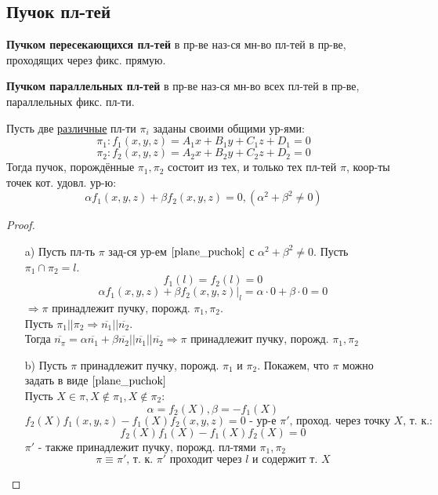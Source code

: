 \subsection{Пучок пл-тей}
\begin{definition}
\textbf{Пучком пересекающихся пл-тей} в пр-ве наз-ся мн-во пл-тей в пр-ве, проходящих через фикс. прямую.
\end{definition}
\begin{definition}
  \textbf{Пучком параллельных пл-тей} в пр-ве наз-ся мн-во всех пл-тей в пр-ве, параллельных фикс. пл-ти.
\end{definition}
\begin{theorem}
  Пусть две \underline{различные} пл-ти $\pi_i$ заданы своими общими ур-ями:
  \[
  \pi_1 \colon f_1(x, y, z) = A_1x +B_1y + C_1z + D_1 = 0
  \]
  \[
  \pi_2 \colon f_2(x, y, z) = A_2x + B_2y + C_2 z + D_2 = 0
  \]
  Тогда пучок, порождённые $\pi_1, \pi_2$ состоит из тех, и только тех пл-тей $\pi$, коор-ты точек кот. удовл. ур-ю:
  \begin{equation}
  \alpha f_1(x, y, z) + \beta f_2(x, y, z) = 0, (\alpha^{2} + \beta^{2} \not= 0)
  \label{plane_puchok}
  \end{equation}
\end{theorem}
\begin{proof}
\begin{itemize}
  \item [a) ]  Пусть пл-ть $\pi$ зад-ся ур-ем $\ref{plane_puchok}$ с $\alpha^{2} + \beta^{2} \neq 0$. Пусть $\pi_1 \cap \pi_2 = l$.
    \[
    f_1(l) = f_2(l) = 0
    \]
    \[
    \alpha f_1(x, y, z) + \beta f_2(x, y, z) |_l = \alpha \cdot 0 + \beta \cdot 0 = 0
    \]
    $\Rightarrow \pi$ принадлежит пучку, порожд. $\pi_1, \pi_2$. \\
    Пусть $\pi_1 || \pi_2 \Rightarrow \overline{n_1} || \overline{n_2}$. \\ 

    Тогда $\overline{n_\pi} = \alpha\overline{n_1} + \beta\overline{n_2} || \overline{n_1} || \overline{n_2} \Rightarrow \pi$ принадлежит пучку, порожд. $\pi_1, \pi_2$
  \item [b) ] Пусть $\pi$ принадлежит пучку, порожд. $\pi_1$ и $\pi_2$. Покажем, что $\pi$ можно задать в виде $\ref{plane_puchok}$ \\

    Пусть $X \in \pi, X \not\in \pi_1, X \not\in \pi_2$:
    \[
    \alpha = f_2(X), \beta = -f_1(X)
    \]
    \[
    f_2(X)f_1(x, y, z) - f_1(X)f_2(x, y, z) = 0 \text{ - ур-е $\pi'$, проход. через точку $X$, т. к.:}
    \]
    \[
    f_2(X)f_1(X) - f_1(X)f_2(X) = 0
    \]
    $\pi'$ - также принадлежит пучку, порожд. пл-тями $\pi_1, \pi_2$
    \[
    \pi \equiv \pi'\text{, т. к. $\pi'$ проходит через $l$ и содержит т. $X$}
    \]
\end{itemize}
\end{proof}

